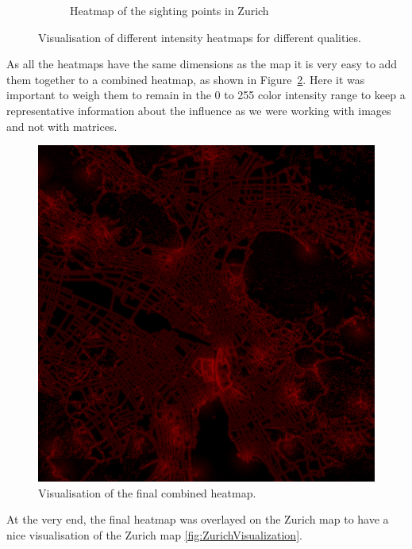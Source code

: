 \documentclass[letterpaper]{article}
\begin{document}
\begin{figure}[htb]
\begin{subfigure}[t]{.48\columnwidth}
        \caption[width=.9\linewidth]{Heatmap of the sighting points in Zurich}
    \end{subfigure}
    \caption{Visualisation of different intensity heatmaps for different qualities.}
    \label{fig:ZurichSingleHeatmaps}
\end{figure}


\indent As all the heatmaps have the same dimensions as the map it is very easy to add them together to a combined heatmap, as shown in Figure~\ref{fig:ZurichAllHeatmaps}. Here it was important to weigh them to remain in the 0 to 255 color intensity range to keep a representative information about the influence as we were working with images and not with matrices.

\begin{figure}
    \centering
    \includegraphics[width=.95\linewidth]{images/combined_heatmap_all.png}
    \caption{Visualisation of the final combined heatmap.}
    \label{fig:ZurichAllHeatmaps}
\end{figure}

\indent At the very end, the final heatmap was overlayed on the Zurich map to have a nice visualisation of the Zurich map \ref{fig:ZurichVisualization}.
\end{document}
